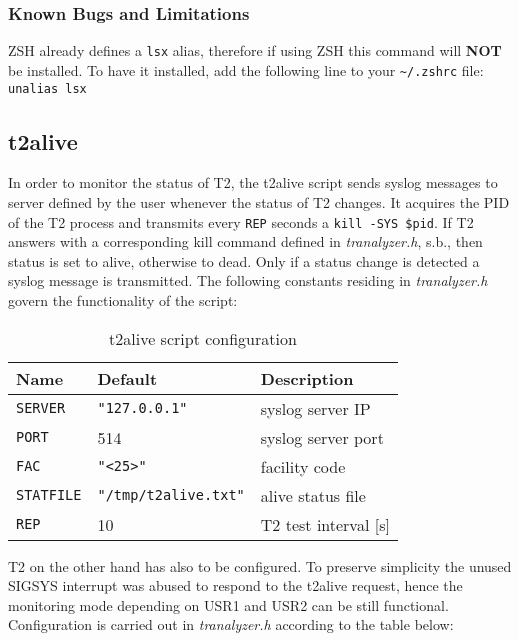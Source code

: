 \documentclass[documentation]{subfiles}
\begin{document}
\subsubsection{Known Bugs and Limitations}
ZSH already defines a {\tt lsx} alias, therefore if using ZSH this command will {\bf NOT} be installed.
To have it installed, add the following line to your {\tt \textasciitilde{}/.zshrc} file: {\tt unalias lsx}

\subsection{t2alive}\label{t2alive}
In order to monitor the status of T2, the t2alive script sends syslog messages to server defined by the user whenever the status of T2 changes.
It acquires the PID of the T2 process and transmits every {\tt REP} seconds a {\tt kill -SYS \$pid}.
If T2 answers with a corresponding kill command defined in {\em tranalyzer.h}, s.b., then status is set to alive, otherwise to dead.
Only if a status change is detected a syslog message is transmitted.
The following constants residing in {\em tranalyzer.h} govern the functionality of the script:

\begin{table}[!ht]
\centering
\begin{tabular}{lll}
    \toprule
    {\bf Name}     & {\bf Default}            & {\bf Description}\\
    \midrule
    {\tt SERVER}   & {\tt "127.0.0.1"}        & syslog server IP\\
    {\tt PORT}     & 514                      & syslog server port\\
    {\tt FAC }     & {\tt "<25>"}             & facility code\\
    {\tt STATFILE} & {\tt "/tmp/t2alive.txt"} & alive status file\\
    {\tt REP}      & 10                       & T2 test interval [s]\\
    \bottomrule
\end{tabular}
\caption{t2alive script configuration}
\end{table}

T2 on the other hand has also to be configured.
To preserve simplicity the unused SIGSYS interrupt was abused to respond to the t2alive request, hence the monitoring mode depending on USR1 and USR2 can be still functional.
Configuration is carried out in {\em tranalyzer.h} according to the table below:
\end{document}

